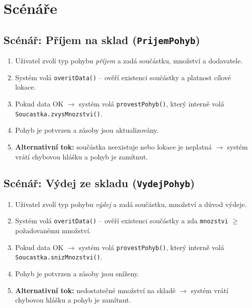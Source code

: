 \newpage
\section{Scénáře}

\subsection{Scénář: Příjem na sklad (\texttt{PrijemPohyb})}
\begin{enumerate}
  \item Uživatel zvolí typ pohybu \emph{příjem} a zadá součástku, množství a dodavatele.
  \item Systém volá \texttt{overitData()} -- ověří existenci součástky a platnost cílové lokace.
  \item Pokud data OK $\rightarrow$ systém volá \texttt{provestPohyb()}, který interně volá \texttt{Soucastka.zvysMnozstvi()}.
  \item Pohyb je potvrzen a zásoby jsou aktualizovány.
  \item \textbf{Alternativní tok:} součástka neexistuje nebo lokace je neplatná $\rightarrow$ systém vrátí chybovou hlášku a pohyb je zamítnut.
\end{enumerate}

\subsection{Scénář: Výdej ze skladu (\texttt{VydejPohyb})}
\begin{enumerate}
  \item Uživatel zvolí typ pohybu \emph{výdej} a zadá součástku, množství a důvod výdeje.
  \item Systém volá \texttt{overitData()} -- ověří existenci součástky a zda \texttt{mnozstvi} $\geq$ požadovanému množství.
  \item Pokud data OK $\rightarrow$ systém volá \texttt{provestPohyb()}, který interně volá \texttt{Soucastka.snizMnozstvi()}.
  \item Pohyb je potvrzen a zásoby jsou sníženy.
  \item \textbf{Alternativní tok:} nedostatečné množství na skladě $\rightarrow$ systém vrátí chybovou hlášku a pohyb je zamítnut.
\end{enumerate}


